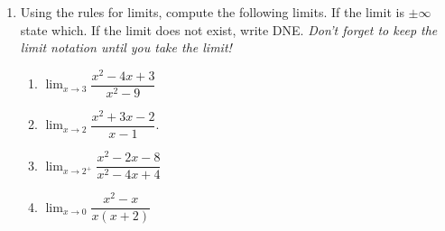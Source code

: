 \documentclass[12pt]{article}
\begin{document}
\begin{enumerate}
    \item Using the rules for limits, compute the following limits. If the limit is $\pm \infty$ state which. If the limit does not exist, write DNE. \emph{Don't forget to keep the limit notation until you take the limit!}

    \begin{enumerate}
        \item $\displaystyle\lim_{x\to 3} \dfrac{x^2-4x+3}{x^2-9}$
        \vfill
        \item $\displaystyle\lim_{x\to 2} \dfrac{x^2+3x-2}{x-1}.$
        \vfill
\pagebreak
        
        \item $\displaystyle\lim_{x\to 2^+} \dfrac{x^2-2x-8}{x^2-4x+4}$
        \vfill 
        \item $\displaystyle\lim_{x\to 0} \dfrac{x^2-x}{x(x+2)}$
        \vfill
    \end{enumerate}
\end{enumerate}
\end{document}
